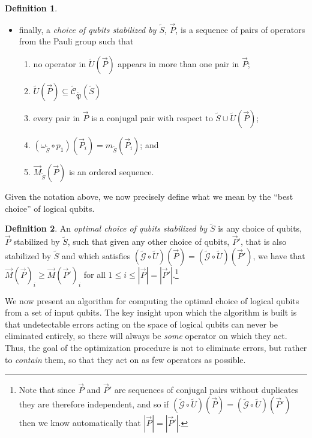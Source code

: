 \documentclass[12pt]{amsbook}
\theoremstyle{plain}
\theoremstyle{definition}
\newtheorem{definition}{Definition}
\theoremstyle{remark}
\newcommand{\lst}{\vec}
\newcommand{\set}{\tilde}
\newcommand{\genfun}{\tilde{\mathcal{G}}}
\newcommand{\pauligroup}{{\set{\mathfrak{P}}}}
\newcommand{\centralizer}{\set{\mathcal{C}}}
\newcommand{\om}{\omega}
\begin{document}
\begin{definition}
\begin{itemize}
\item finally, a \emph{choice of qubits stabilized by $\set S$}, $\lst P$, is a sequence of pairs of operators from the Pauli group such that 
\begin{enumerate}
\item no operator in $\set U(\lst P)$ appears in more than one pair in $\lst P$;
\item $\set U(\lst P)\subseteq \centralizer_\pauligroup(\set S)$
\item every pair in $\lst P$ is a conjugal pair with respect to $\set S \cup \set U(\lst P)$;
\item $(\om_{\set S}\circ p_1)(\lst P_i)=m_{\set S}(\lst P_i)$; and
\item $\lst M_{\set S}(\lst P)$ is an ordered sequence.
\end{enumerate}
\end{itemize}

\end{definition}
Given the notation above, we now precisely define what we mean by the ``best choice'' of logical qubits.

\begin{definition}
An \emph{optimal choice of qubits stabilized by $\set S$} is any choice of qubits, $\lst P$ stabilized by $\set S$, such that given any other choice of qubits, $\lst P'$, that is also stabilized by $\set S$ and which satisfies $(\genfun\circ \set U)(\lst P)=(\genfun\circ \set U)(\lst P')$, we have that $\lst M(\lst P)_i \ge \lst M(\lst P')_i$ for all $1\le i \le |\lst P|=|\lst P'|$.\footnote{Note that since $\lst P$ and $\lst P'$ are sequences of conjugal pairs without duplicates they are therefore independent, and so if $(\genfun\circ \set U)(\lst P)=(\genfun\circ \set U)(\lst P')$ then we know automatically that $|\lst P|=|\lst P'|$.}
\end{definition}
We now present an algorithm for computing the optimal choice of logical qubits from a set of input qubits.  The key insight upon which the algorithm is built is that undetectable errors acting on the space of logical qubits can never be eliminated entirely, so there will always be \emph{some} operator on which they act.  Thus, the goal of the optimization procedure is not to eliminate errors, but rather to \emph{contain} them, so that they act on as few operators as possible.
\end{document}
